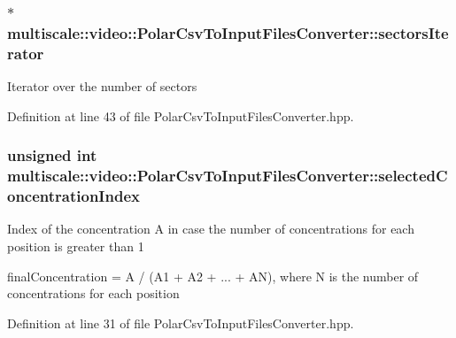 \hypertarget{classmultiscale_1_1video_1_1PolarCsvToInputFilesConverter_aa6895c1613a551cd05195f05ae51862b}{
\subsubsection[{sectors\-Iterator}]{$\ast$ {\bf multiscale\-::video\-::\-Polar\-Csv\-To\-Input\-Files\-Converter\-::sectors\-Iterator}}}\label{classmultiscale_1_1video_1_1PolarCsvToInputFilesConverter_aa6895c1613a551cd05195f05ae51862b}
\-Iterator over the number of sectors 

\-Definition at line 43 of file \-Polar\-Csv\-To\-Input\-Files\-Converter.\-hpp.

\hypertarget{classmultiscale_1_1video_1_1PolarCsvToInputFilesConverter_a121d592659f9f5075c8c78aa46c2950c}{
\subsubsection[{selected\-Concentration\-Index}]{\setlength{\rightskip}{0pt plus 5cm}unsigned int {\bf multiscale\-::video\-::\-Polar\-Csv\-To\-Input\-Files\-Converter\-::selected\-Concentration\-Index}}}\label{classmultiscale_1_1video_1_1PolarCsvToInputFilesConverter_a121d592659f9f5075c8c78aa46c2950c}
\-Index of the concentration \-A in case the number of concentrations for each position is greater than 1

final\-Concentration = \-A / (\-A1 + \-A2 + ... + \-A\-N), where \-N is the number of concentrations for each position 

\-Definition at line 31 of file \-Polar\-Csv\-To\-Input\-Files\-Converter.\-hpp.

